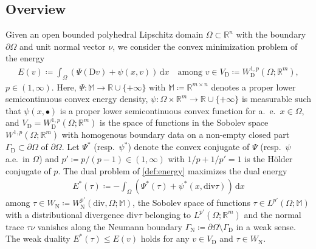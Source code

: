 \documentclass[a4paper]{amsart}
\numberwithin{equation}{section}
\newcommand{\R}{\mathbb{R}}
\renewcommand{\d}[1]{\,\mathrm{d}#1}
\renewcommand{\div}{\mathrm{div}}
\newcommand{\D}{\mathrm{D}}
\newcommand{\M}{\mathbb{M}}
\theoremstyle{remark}
\begin{document}
\subsection{Overview}
Given an open bounded polyhedral Lipschitz domain $\Omega \subset \mathbb{R}^n$ with the boundary $\partial \Omega$ and unit normal vector $\nu$, we consider the convex minimization problem of the energy
\begin{align}
	E(v) \coloneqq \int_\Omega (\Psi(\D v) + \psi(x,v)) \d{x} \quad\text{among } v \in V_\mathrm{D} \coloneqq W^{1,p}_\mathrm{D}(\Omega;\mathbb{R}^m),\label{def:energy}
\end{align}
$p \in (1,\infty)$.
Here, $\Psi : \mathbb{M} \to \mathbb{R} \cup \{+ \infty\}$ with $\mathbb{M} \coloneqq \mathbb{R}^{m \times n}$ denotes a proper lower semicontinuous convex energy density, $\psi : \Omega \times \mathbb{R}^m \to \mathbb{R} \cup \{+\infty\}$ is measurable such that $\psi(x, \bullet)$ is a proper lower semicontinuous convex function for a.~e.~$x \in \Omega$, and $V_\mathrm{D} = W^{1,p}_\mathrm{D}(\Omega;\mathbb{R}^m)$ is the space of functions in the Sobolev space $W^{1,p}(\Omega;\mathbb{R}^m)$ with homogenous boundary data on a non-empty closed part $\Gamma_\mathrm{D} \subset \partial \Omega$ of $\partial \Omega$.
Let $\Psi^*$ (resp.~$\psi^*$) denote the convex conjugate of $\Psi$ (resp.~$\psi$ a.e.~in $\Omega$) and $p' \coloneqq p/(p-1) \in (1,\infty)$ with $1/p + 1/p' = 1$ is the H\"older conjugate of $p$.
The dual problem of \eqref{def:energy} maximizes the dual energy
\begin{align}\label{def:dual-energy}
	E^*(\tau) \coloneqq -\int_\Omega (\Psi^*(\tau) + \psi^*(x, \div \tau)) \d{x}
\end{align}
among $\tau \in W_\mathrm{N} \coloneqq W^{p'}_\mathrm{N}(\div,\Omega;\M)$, the Sobolev space of functions $\tau \in L^{p'}(\Omega;\M)$ with a distributional divergence $\div \tau$ belonging to $L^{p'}(\Omega;\R^m)$ and the normal trace $\tau \nu$ vanishes along the Neumann boundary $\Gamma_\mathrm{N} \coloneqq \partial \Omega \setminus \Gamma_\mathrm{D}$ in a weak sense.
The weak duality $E^*(\tau) \leq E(v)$ holds for any $v \in V_\mathrm{D}$ and $\tau \in W_\mathrm{N}$.
\end{document}

